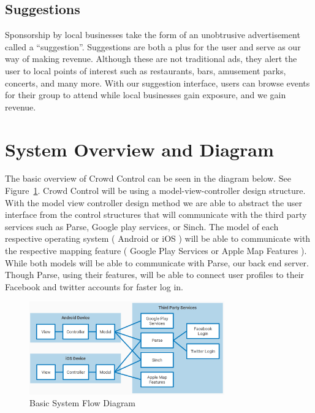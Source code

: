 \subsection{Suggestions}
Sponsorship by local businesses take the form of an unobtrusive advertisement called a ``suggestion''. Suggestions are both a plus for the user and serve as our way of making revenue. Although these are not traditional ads, they alert the user to local points of interest such as restaurants, bars, amusement parks, concerts, and many more. With our suggestion interface, users can browse events for their group to attend while local businesses gain exposure, and we gain revenue.

\section{System Overview and Diagram}
The basic overview of Crowd Control can be seen in the diagram below. See Figure~\ref{ModuleFlowDiagram}. Crowd Control will be using a model-view-controller design structure. With the model view controller design method we are able to abstract the user interface from the control structures that will communicate with the third party services such as Parse, Google play services, or Sinch. The model of each respective operating system ( Android or iOS ) will be able to communicate with the respective mapping feature ( Google Play Services or Apple Map Features ). While both models will be able to communicate with Parse, our back end server. Though Parse, using their features, will be able to connect user profiles to their Facebook and twitter accounts for faster log in.

\begin{figure}[tbh]
\begin{center}
\includegraphics[width=0.75\textwidth]{Additional/designpictures/ModuleFlowDiagram2.png}
\end{center}
\caption{Basic System Flow Diagram \label{ModuleFlowDiagram}}
\end{figure}

